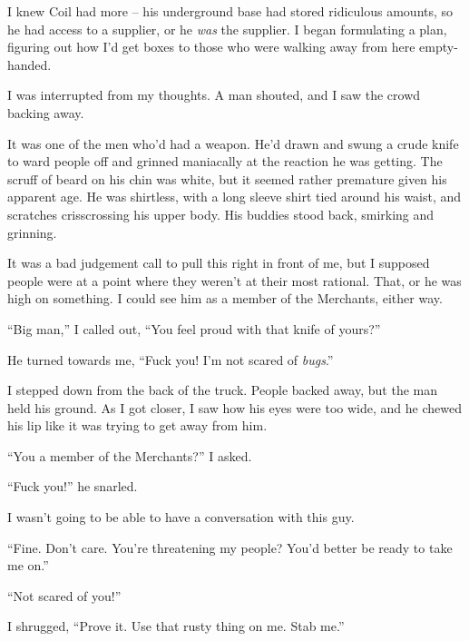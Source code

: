 I knew Coil had more – his underground base had stored ridiculous amounts, so he had access to a supplier, or he \emph{was} the supplier.  I began formulating a plan, figuring out how I'd get boxes to those who were walking away from here empty-handed.



I was interrupted from my thoughts.  A man shouted, and I saw the crowd backing away.



It was one of the men who'd had a weapon.  He'd drawn and swung a crude knife to ward people off and grinned maniacally at the reaction he was getting.  The scruff of beard on his chin was white, but it seemed rather premature given his apparent age.  He was shirtless, with a long sleeve shirt tied around his waist, and scratches crisscrossing his upper body.  His buddies stood back, smirking and grinning.



It was a bad judgement call to pull this right in front of me, but I supposed people were at a point where they weren't at their most rational.  That, or he was high on something.  I could see him as a member of the Merchants, either way.



``Big man,'' I called out, ``You feel proud with that knife of yours?''



He turned towards me, ``Fuck you!  I'm not scared of \emph{bugs}.''



I stepped down from the back of the truck.  People backed away, but the man held his ground.  As I got closer, I saw how his eyes were too wide, and he chewed his lip like it was trying to get away from him.



``You a member of the Merchants?'' I asked.



``Fuck you!'' he snarled.



I wasn't going to be able to have a conversation with this guy.



``Fine.  Don't care.  You're threatening my people?  You'd better be ready to take me on.''



``Not scared of you!''



I shrugged, ``Prove it.  Use that rusty thing on me.  Stab me.''



